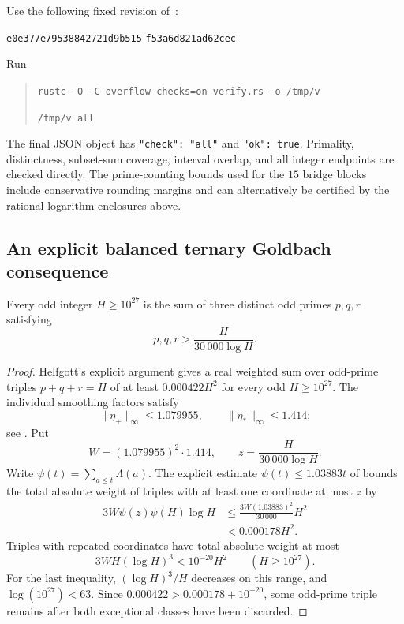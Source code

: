 \begin{remark}
\label{rem:fraiture-reproduce}
\leavevmode\par\noindent
Use the following fixed revision of~\cite{FraitureVerifier}:
\par\noindent
\texttt{e0e377e79538842721d9b515}%
\allowbreak\texttt{f53a6d821ad62cec}
\par\noindent
Run
\begin{quote}
\texttt{rustc -O -C overflow-checks=on verify.rs -o /tmp/v}\par
\texttt{/tmp/v all}
\end{quote}
The final JSON object has \texttt{"check": "all"} and
\texttt{"ok": true}.  Primality, distinctness, subset-sum coverage,
interval overlap, and all integer endpoints are checked directly.  The
prime-counting bounds used for the $15$ bridge blocks include conservative
rounding margins and can alternatively be certified by the rational
logarithm enclosures above.
\end{remark}

\subsection{An explicit balanced ternary Goldbach consequence}

\begin{lemma}\label{lem:fraiture-balanced-goldbach}
Every odd integer $H\geq10^{27}$ is the sum of three distinct odd primes
$p,q,r$ satisfying
\[
 p,q,r>\frac{H}{30\,000\log H}.
\]
\end{lemma}

\begin{proof}
Helfgott's explicit argument
\cite[\S7.4, equations (7.49)--(7.50)]{Helfgott} gives a real
weighted sum over odd-prime triples $p+q+r=H$ of at least
$0.000422H^2$ for every odd $H\geq10^{27}$.  The individual smoothing
factors satisfy
\[
 \lVert\eta_+\rVert_\infty\leq1.079955,
 \qquad
 \lVert\eta_*\rVert_\infty\leq1.414;
\]
see \cite[equations (7.3) and (7.19)]{Helfgott}.  Put
\[
 W=(1.079955)^2\cdot1.414,
 \qquad z=\frac{H}{30\,000\log H}.
\]
Write $\psi(t)=\sum_{a\leq t}\Lambda(a)$.  The explicit estimate
$\psi(t)\leq1.03883t$ of
\cite{RosserSchoenfeld} bounds the total absolute weight of triples with
at least one coordinate at most $z$ by
\begin{align*}
 3W\psi(z)\psi(H)\log H
 &\leq\frac{3W(1.03883)^2}{30\,000}H^2\\
 &<0.000178H^2.
\end{align*}
Triples with repeated coordinates have total absolute weight at most
\[
 3WH(\log H)^3<10^{-20}H^2
 \qquad(H\geq10^{27}).
\]
For the last inequality, $(\log H)^3/H$ decreases on this range, and
$\log(10^{27})<63$.  Since
$0.000422>0.000178+10^{-20}$, some odd-prime triple remains after both
exceptional classes have been discarded.
\end{proof}


